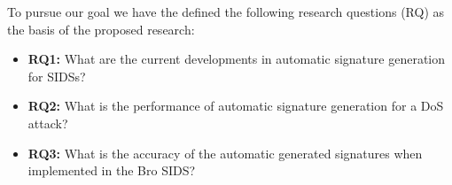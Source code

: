 To pursue our goal we have the defined the following research questions (RQ) as the basis of the proposed research:





\begin{itemize}	
	\item \textbf{RQ1:} What are the current developments in automatic signature generation for SIDSs?
	\item \textbf{RQ2:} What is the performance of automatic signature generation for a DoS attack?
	 \item \textbf{RQ3:} What is the accuracy of the automatic generated signatures when implemented in the Bro SIDS?
\end{itemize}







